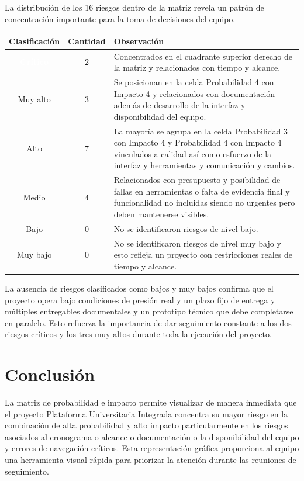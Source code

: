 \documentclass[11pt,spanish]{article}
\begin{document}
La distribución de los 16 riesgos dentro de la matriz revela un patrón de concentración importante para la toma de decisiones del equipo.

\begin{table}[H]
\centering
\begin{tabularx}{\textwidth}{c c Y}
\toprule
\textbf{Clasificación} & \textbf{Cantidad} & \textbf{Observación} \\
\midrule
{}\textcolor{white}{\textbf{Crítico}} & 2 & Concentrados en el cuadrante superior derecho de la matriz y relacionados con tiempo y alcance. \\
 Muy alto & 3 & Se posicionan en la celda Probabilidad 4 con Impacto 4 y relacionados con documentación además de desarrollo de la interfaz y disponibilidad del equipo. \\
 Alto & 7 & La mayoría se agrupa en la celda Probabilidad 3 con Impacto 4 y Probabilidad 4 con Impacto 4 vinculados a calidad así como esfuerzo de la interfaz y herramientas y comunicación y cambios. \\
 Medio & 4 & Relacionados con presupuesto y posibilidad de fallas en herramientas o falta de evidencia final y funcionalidad no incluidas siendo no urgentes pero deben mantenerse visibles. \\
 Bajo & 0 & No se identificaron riesgos de nivel bajo. \\
 Muy bajo & 0 & No se identificaron riesgos de nivel muy bajo y esto refleja un proyecto con restricciones reales de tiempo y alcance. \\
\bottomrule
\end{tabularx}
\end{table}

La ausencia de riesgos clasificados como bajos y muy bajos confirma que el proyecto opera bajo condiciones de presión real y un plazo fijo de entrega y múltiples entregables documentales y un prototipo técnico que debe completarse en paralelo. Esto refuerza la importancia de dar seguimiento constante a los dos riesgos críticos y los tres muy altos durante toda la ejecución del proyecto.

\section{Conclusión}

La matriz de probabilidad e impacto permite visualizar de manera inmediata que el proyecto Plataforma Universitaria Integrada concentra su mayor riesgo en la combinación de alta probabilidad y alto impacto particularmente en los riesgos asociados al cronograma o alcance o documentación o la disponibilidad del equipo y errores de navegación críticos. Esta representación gráfica proporciona al equipo una herramienta visual rápida para priorizar la atención durante las reuniones de seguimiento.
\end{document}
